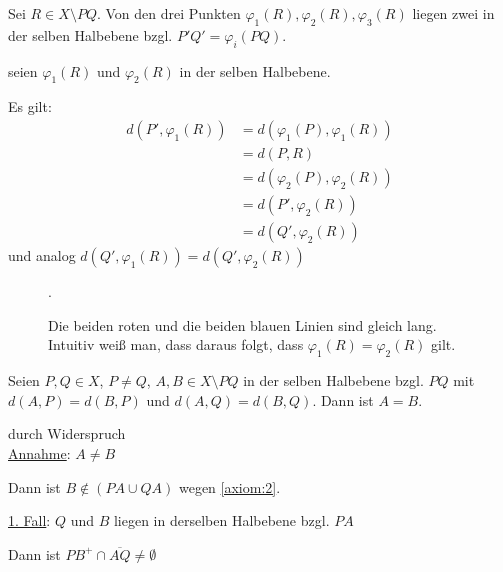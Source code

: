 \begin{beweis}
\begin{beweis}
        \begin{beweis}[Beweis 1]
            Sei $R \in X \setminus PQ$. Von den drei Punkten 
            $\varphi_1(R), \varphi_2(R), \varphi_3(R)$ liegen zwei
            in der selben Halbebene bzgl. $P'Q' = \varphi_i(PQ)$.

            \Obda seien $\varphi_1(R)$ und $\varphi_2(R)$ in der 
            selben Halbebene.

            Es gilt: 
            \begin{align}
                d(P', \varphi_1(R)) &= d(\varphi_1(P), \varphi_1(R))\\
                    &= d(P, R)\\
                    &= d(\varphi_2(P), \varphi_2(R))\\
                    &= d(P', \varphi_2(R))\\
                    &= d(Q', \varphi_2(R))
            \end{align}
            und analog $d(Q', \varphi_1(R)) = d(Q', \varphi_2(R))$

            \begin{figure}
                \centering
                
                \caption{Die beiden roten und die beiden blauen Linien sind gleich lang. Intuitiv weiß man, dass daraus folgt, dass $\varphi_1(R) = \varphi_2(R)$ gilt.}.
                \label{fig:bild-2}
            \end{figure}
        \end{beweis}

        \begin{korollar}\label{kor:14.6}%
            Seien $P, Q \in X$, $P \neq Q$, $A, B \in X \setminus PQ$
            in der selben Halbebene bzgl. $PQ$ mit $d(A, P) = d(B, P)$
            und $d(A, Q) = d(B, Q)$. Dann ist $A = B$.
        \end{korollar}
        \begin{beweis} durch Widerspruch\\
            \underline{Annahme}: $A \neq B$

            Dann ist $B \notin (PA \cup QA)$ wegen \ref{axiom:2}.

            \underline{1. Fall}: $Q$ und $B$ liegen in derselben Halbebene bzgl. $PA$
            \begin{behauptung}[Beh. 3]
                Dann ist $PB^+ \cap \overline{AQ} \neq \emptyset$
            \end{behauptung}


\end{beweis}
\end{beweis}
\end{beweis}
